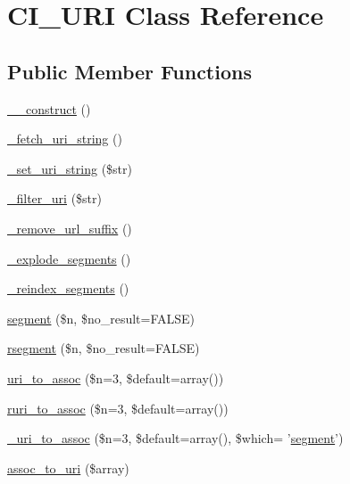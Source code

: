 \hypertarget{class_c_i___u_r_i}{\section{C\-I\-\_\-\-U\-R\-I Class Reference}
\label{class_c_i___u_r_i}
}
\subsection*{Public Member Functions}
\begin{DoxyCompactItemize}
\item 
\hyperlink{class_c_i___u_r_i_a095c5d389db211932136b53f25f39685}{\-\_\-\-\_\-construct} ()
\item 
\hyperlink{class_c_i___u_r_i_adfc05ba05789de235466da80e2a34883}{\-\_\-fetch\-\_\-uri\-\_\-string} ()
\item 
\hyperlink{class_c_i___u_r_i_a81a4c4d50fbac24b9ae091f9cfcaade3}{\-\_\-set\-\_\-uri\-\_\-string} (\$str)
\item 
\hyperlink{class_c_i___u_r_i_ac1f311bdebd0d37a5f255562a5874dc7}{\-\_\-filter\-\_\-uri} (\$str)
\item 
\hyperlink{class_c_i___u_r_i_a5f02a9ac7030eaf1140aacb4863af960}{\-\_\-remove\-\_\-url\-\_\-suffix} ()
\item 
\hyperlink{class_c_i___u_r_i_a26cd2b70f2ca8ddfe42a74e7c9c71068}{\-\_\-explode\-\_\-segments} ()
\item 
\hyperlink{class_c_i___u_r_i_a12533dc88e2061577867a91fa4f25c34}{\-\_\-reindex\-\_\-segments} ()
\item 
\hyperlink{class_c_i___u_r_i_a6f0bc9309bced907b54cf2178b359b9c}{segment} (\$n, \$no\-\_\-result=F\-A\-L\-S\-E)
\item 
\hyperlink{class_c_i___u_r_i_afe281d36faa29580e32aed250c88af80}{rsegment} (\$n, \$no\-\_\-result=F\-A\-L\-S\-E)
\item 
\hyperlink{class_c_i___u_r_i_a67cca74de71898ee88c167a265cff140}{uri\-\_\-to\-\_\-assoc} (\$n=3, \$default=array())
\item 
\hyperlink{class_c_i___u_r_i_a3f375a2026349f1fce7915966eba6d5b}{ruri\-\_\-to\-\_\-assoc} (\$n=3, \$default=array())
\item 
\hyperlink{class_c_i___u_r_i_a8f7962a57049a3767fdfa4c1a004dc98}{\-\_\-uri\-\_\-to\-\_\-assoc} (\$n=3, \$default=array(), \$which= '\hyperlink{class_c_i___u_r_i_a6f0bc9309bced907b54cf2178b359b9c}{segment}')
\item 
\hyperlink{class_c_i___u_r_i_a5c17149885c92fef1ed7f191f14a3f4d}{assoc\-\_\-to\-\_\-uri} (\$array)

\end{DoxyCompactItemize}
